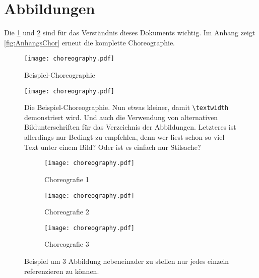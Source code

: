 \section{Abbildungen}

Die \cref{fig:chor1} und \ref{fig:chor2} sind für das Verständnis dieses Dokuments wichtig.
Im Anhang zeigt \vref{fig:AnhangsChor} erneut die komplette Choreographie.


\begin{figure}
  \centering
  \texttt{[image: choreography.pdf]}
  \caption{Beispiel-Choreographie}
  \label{fig:chor1}
\end{figure}



\begin{figure}
  \centering
  \texttt{[image: choreography.pdf]}
  \caption[Beispiel-Choreographie]{Die Beispiel-Choreographie.
    Nun etwas kleiner, damit \texttt{\textbackslash textwidth} demonstriert wird.
    Und auch die Verwendung von alternativen Bildunterschriften für das Verzeichnis der Abbildungen.
    Letzteres ist allerdings nur Bedingt zu empfehlen, denn wer liest schon so viel Text unter einem Bild?
    Oder ist es einfach nur Stilsache?
  }
  \label{fig:chor2}
\end{figure}


\begin{figure}
  \hfill
  \begin{subfigure}{.3\textwidth}
    \texttt{[image: choreography.pdf]}
    \caption{Choreografie 1}
    \label{fig:subfigA}
  \end{subfigure}
  \hfill
  \begin{subfigure}{.3\textwidth}
    \texttt{[image: choreography.pdf]}
    \caption{Choreografie 2}
    \label{fig:subfigB}
  \end{subfigure}
  \hfill
  \begin{subfigure}{.3\textwidth}
    \texttt{[image: choreography.pdf]}
    \caption{Choreografie 3}
    \label{fig:subfigC}
  \end{subfigure}
  \caption{Beispiel um 3 Abbildung nebeneinader zu stellen nur jedes einzeln referenzieren zu können.}
  \label{fig:subfig_example}
\end{figure}

